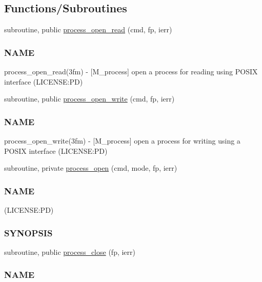 \subsection*{Functions/\+Subroutines}
\begin{DoxyCompactItemize}
\item 
subroutine, public \mbox{\hyperlink{namespacem__process_aaaf4d1926258a4cec7da7fc61c38c79d}{process\+\_\+open\+\_\+read}} (cmd, fp, ierr)
\begin{DoxyCompactList}\small\item\em \subsubsection*{N\+A\+ME}

process\+\_\+open\+\_\+read(3fm) -\/ \mbox{[}M\+\_\+process\mbox{]} open a process for reading using P\+O\+S\+IX interface (L\+I\+C\+E\+N\+SE\+:PD) \end{DoxyCompactList}\item 
subroutine, public \mbox{\hyperlink{namespacem__process_aa6ed1404ab3472f5068ed15a7a01defc}{process\+\_\+open\+\_\+write}} (cmd, fp, ierr)
\begin{DoxyCompactList}\small\item\em \subsubsection*{N\+A\+ME}

process\+\_\+open\+\_\+write(3fm) -\/ \mbox{[}M\+\_\+process\mbox{]} open a process for writing using a P\+O\+S\+IX interface (L\+I\+C\+E\+N\+SE\+:PD) \end{DoxyCompactList}\item 
subroutine, private \mbox{\hyperlink{namespacem__process_a3c0f543a9ceff2671041d73660f60a59}{process\+\_\+open}} (cmd, mode, fp, ierr)
\begin{DoxyCompactList}\small\item\em \subsubsection*{N\+A\+ME}

(L\+I\+C\+E\+N\+SE\+:PD) \subsubsection*{S\+Y\+N\+O\+P\+S\+IS}\end{DoxyCompactList}\item 
subroutine, public \mbox{\hyperlink{namespacem__process_ab4c5cad3fb46686f0c9b71c3a634f6ae}{process\+\_\+close}} (fp, ierr)
\begin{DoxyCompactList}\small\item\em \subsubsection*{N\+A\+ME}


\end{DoxyCompactList}
\end{DoxyCompactItemize}
